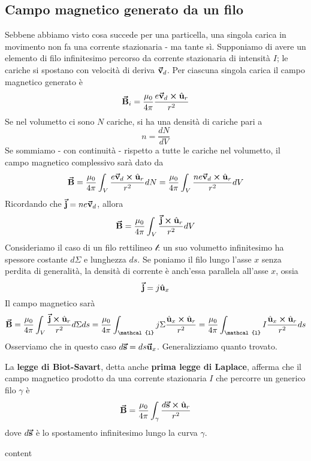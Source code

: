 \subsection{Campo magnetico generato da un filo}
Sebbene abbiamo visto cosa succede per una particella, una singola carica in movimento non fa una corrente stazionaria - ma tante sì. Supponiamo di avere un elemento di filo infinitesimo percorso da corrente stazionaria di intensità $I$; le cariche si spostano con velocità di deriva $\vb*{\va{v}}_d$. Per ciascuna singola carica il campo magnetico generato è
\begin{equation}
	\vb*{\va{B}}_i=\frac{\mu_0}{4\pi}\frac{e\vb*{\va{v}}_d\cross\hat{\mathbf{u}}_r}{r^2}
\end{equation}
Se nel volumetto ci sono $N$ cariche, si ha una densità di cariche pari a
\begin{equation*}
	n=\frac{dN}{dV}
\end{equation*}
Se sommiamo - con continuità - rispetto a tutte le cariche nel volumetto, il campo magnetico complessivo sarà dato da
\begin{equation*}
	\vb*{\va{B}}=\frac{\mu_0}{4\pi}\int_V\frac{e\vb*{\va{v}}_d\cross\hat{\mathbf{u}}_r}{r^2}dN=\frac{\mu_0}{4\pi}\int_V\frac{ne\vb*{\va{v}}_d\cross\hat{\mathbf{u}}_r}{r^2}dV
\end{equation*}
Ricordando che $\vb*{\va{j}}=ne\vb*{\va{v}}_d$, allora
\begin{equation*}
	\vb*{\va{B}}=\frac{\mu_0}{4\pi}\int_V\frac{\vb*{\va{j}}\cross\hat{\mathbf{u}}_r}{r^2}dV
\end{equation*}
Consideriamo il caso di un filo rettilineo  $\mathcal{l}$: un suo volumetto infinitesimo ha spessore costante $d\Sigma$ e lunghezza $ds$. Se poniamo il filo lungo l'asse $x$ senza perdita di generalità, la densità di corrente è anch'essa parallela all'asse $x$, ossia
\begin{equation*}
	\vb*{\va{j}}=j\hat{\mathbf{u}}_x
\end{equation*}
Il campo magnetico sarà
\begin{equation*}
	\vba{B}=\frac{\mu_0}{4\pi}\int_V\frac{\vba{j}\cross\vbh{u}_r}{r^2}d\Sigma ds=\frac{\mu_0}{4\pi}\int_{\mathcal{l}}j\Sigma\frac{\vbh{u}_x\cross\vbh{u}_r}{r^2}=\frac{\mu_0}{4\pi}\int_{\mathcal{l}}I\frac{\vbh{u}_x\cross\vbh{u}_r}{r^2}ds
\end{equation*}
Osserviamo che in questo caso $d\vb*{\va{s}}=ds\vb*{\va{u}}_x$. Generalizziamo quanto trovato.

\begin{define}
	La \textbf{legge di Biot-Savart}, detta anche \textbf{prima legge di Laplace}, afferma che il campo magnetico prodotto da una corrente stazionaria $I$ che percorre un generico filo $\gamma$ è
	\begin{equation*}
		\vb*{\va{B}}=\frac{\mu_0}{4\pi}\int_{\gamma}\frac{d\vb*{\va{s}}\cross\hat{\mathbf{u}}_r}{r^2}
	\end{equation*}
	dove $d\vb*{\va{s}}$ è lo spostamento infinitesimo lungo la curva $\gamma$.
\end{define}
\begin{examplewt}
	content
\end{examplewt}